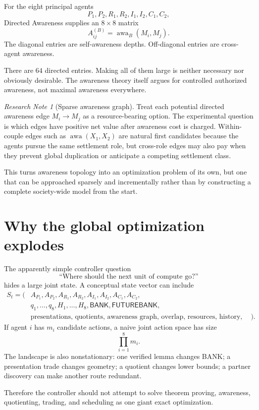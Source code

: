 \documentclass[11pt]{article}
\theoremstyle{definition}
\theoremstyle{remark}
\newtheorem{researchnote}[theorem]{Research Note}
\newcommand{\awa}{\operatorname{awa}}
\newcommand{\BANK}{\mathsf{BANK}}
\newcommand{\FUTUREBANK}{\mathsf{FUTUREBANK}}
\begin{document}
For the eight principal agents
\[
P_1,P_2,R_1,R_2,I_1,I_2,C_1,C_2,
\]
Directed Awareness supplies an $8\times8$ matrix
\[
A^{(B)}_{ij}=\awa_B(M_i,M_j).
\]
The diagonal entries are self-awareness depths. Off-diagonal entries are cross-agent awareness.

There are $64$ directed entries. Making all of them large is neither necessary nor obviously desirable. The awareness theory itself argues for controlled authorized awareness, not maximal awareness everywhere.

\begin{researchnote}[Sparse awareness graph]
Treat each potential directed awareness edge $M_i\to M_j$ as a resource-bearing option. The experimental question is which edges have positive net value after awareness cost is charged. Within-couple edges such as $\awa(X_1,X_2)$ are natural first candidates because the agents pursue the same settlement role, but cross-role edges may also pay when they prevent global duplication or anticipate a competing settlement class.
\end{researchnote}

This turns awareness topology into an optimization problem of its own, but one that can be approached sparsely and incrementally rather than by constructing a complete society-wide model from the start.

\section{Why the global optimization explodes}

The apparently simple controller question
\[
\text{``Where should the next unit of compute go?''}
\]
hides a large joint state. A conceptual state vector can include
\[
\begin{aligned}
S_t=(&A_{P_1},A_{P_2},A_{R_1},A_{R_2},A_{I_1},A_{I_2},A_{C_1},A_{C_2},\\
&q_1,\ldots,q_8,H_1,\ldots,H_8,\BANK,\FUTUREBANK,\\
&\text{presentations, quotients, awareness graph, overlap, resources, history, uncertainty}).
\end{aligned}
\]
If agent $i$ has $m_i$ candidate actions, a naive joint action space has size
\[
\prod_{i=1}^{8}m_i.
\]
The landscape is also nonstationary: one verified lemma changes BANK; a presentation trade changes geometry; a quotient changes lower bounds; a partner discovery can make another route redundant.

Therefore the controller should not attempt to solve theorem proving, awareness, quotienting, trading, and scheduling as one giant exact optimization.
\end{document}

